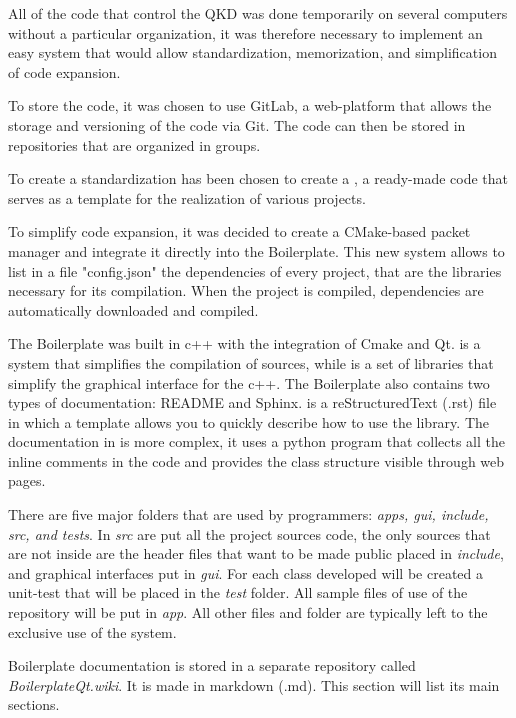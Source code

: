 All of the code that control the QKD was done temporarily on several computers without a particular organization, it was therefore necessary to implement an easy system that would allow standardization, memorization, and simplification of code expansion.

To store the code, it was chosen to use GitLab, a web-platform that allows the storage and versioning of the code via Git. The code can then be stored in repositories that are organized in groups.

To create a standardization has been chosen to create a , a ready-made code that serves as a template for the realization of various projects.

To simplify code expansion, it was decided to create a CMake-based packet manager and integrate it directly into the Boilerplate. This new system allows to list in a file "config.json" the dependencies of every project, that are the libraries necessary for its compilation.
When the project is compiled, dependencies are automatically downloaded and compiled.

The Boilerplate was built in c++ with the integration of Cmake and Qt.
 is a system that simplifies the compilation of sources, while  is a set of libraries that simplify the graphical interface for the c++. The Boilerplate also contains two types of documentation: README and Sphinx.
 is a reStructuredText (.rst) file in which a template allows you to quickly describe how to use the library.
The documentation in  is more complex, it uses a python program that collects all the inline comments in the code and provides the class structure visible through web pages.

There are five major folders that are used by programmers: \textit{apps, gui, include, src, and tests}.
In \textit{src} are put all the project sources code, the only sources that are not inside are the header files that want to be made public placed in \textit{include}, and graphical interfaces put in \textit{gui}.
For each class developed will be created a unit-test that will be placed in the \textit{test} folder. All sample files of use of the repository will be put in \textit{app}.
All other files and folder are typically left to the exclusive use of the system.

Boilerplate documentation is stored in a separate repository called \textit{BoilerplateQt.wiki}. It is made in markdown (.md). This section will list its main sections.
  {\parindent0pt
    
    
    
    
    
    
  }
